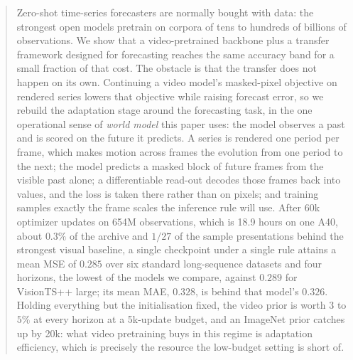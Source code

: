 \begin{abstract}

Zero-shot time-series forecasters are normally bought with data: the strongest open models pretrain
on corpora of tens to hundreds of billions of observations. We show that a video-pretrained backbone
plus a transfer framework designed for forecasting reaches the same accuracy band for a small
fraction of that cost. The obstacle is that the transfer does not happen on its own. Continuing a
video model's masked-pixel objective on rendered series lowers that objective while raising forecast
error, so we rebuild the adaptation stage around the forecasting task, in the one operational sense
of \emph{world model} this paper uses: the model observes a past and is scored on the future it
predicts. A series is rendered one period per frame, which makes motion across frames the evolution
from one period to the next; the model predicts a masked block of future frames from the visible
past alone; a differentiable read-out decodes those frames back into values, and the loss is taken
there rather than on pixels; and training samples exactly the frame scales the inference rule will
use. After 60k optimizer updates on 654M observations, which is 18.9 hours on one A40, about
$0.3\%$ of the archive and $1/27$ of the sample presentations behind the strongest visual baseline,
a single checkpoint under a single rule attains a mean MSE of $0.285$ over six standard
long-sequence datasets and four horizons, the lowest of the models we compare, against $0.289$ for
VisionTS++ large; its mean MAE, $0.328$, is behind that model's $0.326$. Holding everything but the
initialisation fixed, the video prior is worth $3$ to $5\%$ at every horizon at a 5k-update budget,
and an ImageNet prior catches up by 20k: what video pretraining buys in this regime is adaptation
efficiency, which is precisely the resource the low-budget setting is short of.

\end{abstract}

